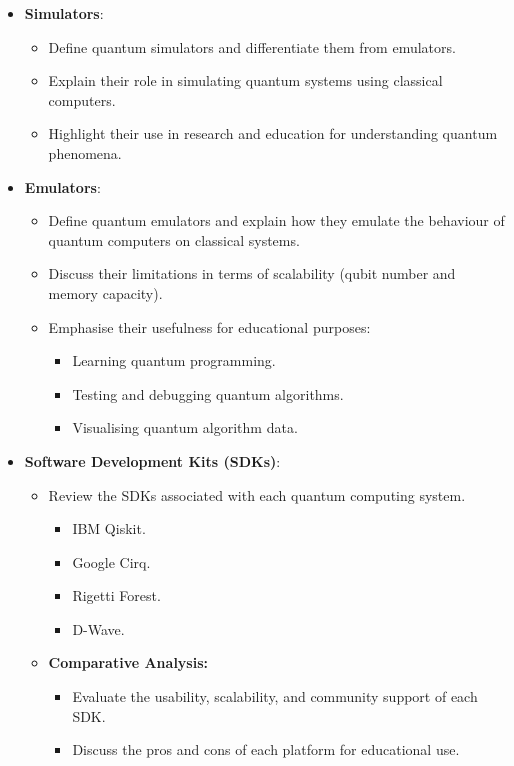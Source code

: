 \begin{itemize}
\begin{itemize}
\begin{itemize}
                \end{itemize}
        \end{itemize}
    \item \textbf{Simulators}:
        \begin{itemize}
            \item Define quantum simulators and differentiate them from emulators.
            \item Explain their role in simulating quantum systems using classical computers. 
            \item Highlight their use in research and education for understanding quantum phenomena.
        \end{itemize}
    \item \textbf{Emulators}:
        \begin{itemize}
            \item Define quantum emulators and explain how they emulate the behaviour of quantum computers on classical systems.
            \item Discuss their limitations in terms of scalability (qubit number and memory capacity).
            \item Emphasise their usefulness for educational purposes:
                \begin{itemize}
                    \item Learning quantum programming.
                    \item Testing and debugging quantum algorithms. 
                    \item Visualising quantum algorithm data. 
                \end{itemize}
        \end{itemize}
    \item \textbf{Software Development Kits (SDKs)}:
        \begin{itemize}
            \item Review the SDKs associated with each quantum computing system. 
                \begin{itemize}
                    \item IBM Qiskit.
                    \item Google Cirq. 
                    \item Rigetti Forest.
                    \item D-Wave.
                \end{itemize}
            \item \textbf{Comparative Analysis:} 
                \begin{itemize}
                    \item Evaluate the usability, scalability, and community support of each SDK. 
                    \item Discuss the pros and cons of each platform for educational use. 
                \end{itemize}
        \end{itemize}
\end{itemize}

